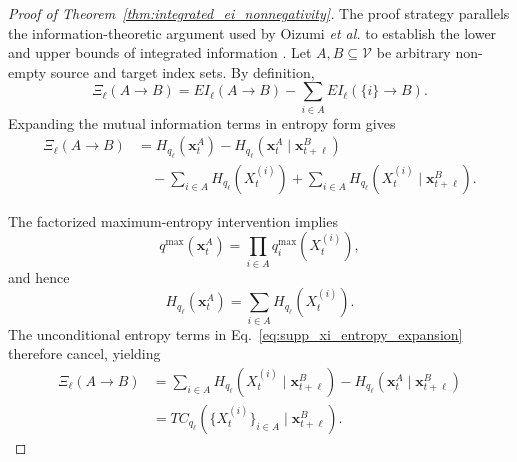 \documentclass[fleqn,10pt]{wlscirep}
\begin{document}
\begin{proof}[Proof of Theorem~\ref{thm:integrated_ei_nonnegativity}]

The proof strategy parallels the information-theoretic argument used by
Oizumi \emph{et al.} to establish the lower and upper bounds of integrated
information \cite{Oizumi2016MeasuringII}. Let \(A,B\subseteq\mathcal{V}\) be arbitrary non-empty source and target index
sets. By definition,
\begin{equation}
    \Xi_{\ell}(A\rightarrow B)
    =
    EI_{\ell}(A\rightarrow B)
    -
    \sum_{i\in A}
    EI_{\ell}(\{i\}\rightarrow B).
    \label{eq:supp_xi_definition}
\end{equation}
Expanding the mutual information terms in entropy form gives
\begin{align}
    \Xi_{\ell}(A\rightarrow B)
    &=
    H_{q_{\ell}}
    \left(
        \boldsymbol{x}_{t}^{A}
    \right)
    -
    H_{q_{\ell}}
    \left(
        \boldsymbol{x}_{t}^{A}
        \mid
        \boldsymbol{x}_{t+\ell}^{B}
    \right)
    \nonumber\\
    &\quad-
    \sum_{i\in A}
    H_{q_{\ell}}
    \left(
        X_t^{(i)}
    \right)
    +
    \sum_{i\in A}
    H_{q_{\ell}}
    \left(
        X_t^{(i)}
        \mid
        \boldsymbol{x}_{t+\ell}^{B}
    \right).
    \label{eq:supp_xi_entropy_expansion}
\end{align}

The factorized maximum-entropy intervention implies
\begin{equation}
    q^{\max}
    \left(
        \boldsymbol{x}_{t}^{A}
    \right)
    =
    \prod_{i\in A}
    q_i^{\max}
    \left(
        X_t^{(i)}
    \right),
    \label{eq:supp_factorized_intervention}
\end{equation}
and hence
\begin{equation}
    H_{q_{\ell}}
    \left(
        \boldsymbol{x}_{t}^{A}
    \right)
    =
    \sum_{i\in A}
    H_{q_{\ell}}
    \left(
        X_t^{(i)}
    \right).
    \label{eq:supp_factorized_entropy}
\end{equation}
The unconditional entropy terms in
Eq.~\eqref{eq:supp_xi_entropy_expansion} therefore cancel, yielding
\begin{align}
    \Xi_{\ell}(A\rightarrow B)
    &=
    \sum_{i\in A}
    H_{q_{\ell}}
    \left(
        X_t^{(i)}
        \mid
        \boldsymbol{x}_{t+\ell}^{B}
    \right)
    -
    H_{q_{\ell}}
    \left(
        \boldsymbol{x}_{t}^{A}
        \mid
        \boldsymbol{x}_{t+\ell}^{B}
    \right)
    \nonumber\\
    &=
    TC_{q_{\ell}}
    \left(
        \{X_t^{(i)}\}_{i\in A}
        \mid
        \boldsymbol{x}_{t+\ell}^{B}
    \right).
    \label{eq:supp_xi_conditional_tc}
\end{align}


\end{proof}
\end{document}
